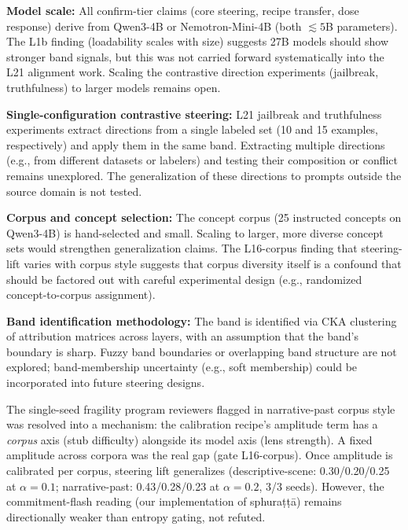 \textbf{Model scale:} All confirm-tier claims (core steering, recipe transfer, dose response) derive from Qwen3-4B
or Nemotron-Mini-4B (both $\lesssim 5$B parameters). The L1b finding (loadability scales with size) suggests
27B models should show stronger band signals, but this was not carried forward systematically into the L21 alignment
work. Scaling the contrastive direction experiments (jailbreak, truthfulness) to larger models remains open.

\textbf{Single-configuration contrastive steering:} L21 jailbreak and truthfulness experiments extract directions from
a single labeled set (10 and 15 examples, respectively) and apply them in the same band. Extracting multiple directions
(e.g., from different datasets or labelers) and testing their composition or conflict remains unexplored.
The generalization of these directions to prompts outside the source domain is not tested.

\textbf{Corpus and concept selection:} The concept corpus (25 instructed concepts on Qwen3-4B) is hand-selected and
small. Scaling to larger, more diverse concept sets would strengthen generalization claims. The L16-corpus finding
that steering-lift varies with corpus style suggests that corpus diversity itself is a confound that should be factored
out with careful experimental design (e.g., randomized concept-to-corpus assignment).

\textbf{Band identification methodology:} The band is identified via CKA clustering of attribution matrices across layers,
with an assumption that the band's boundary is sharp. Fuzzy band boundaries or overlapping band structure are not explored;
band-membership uncertainty (e.g., soft membership) could be incorporated into future steering designs.

The single-seed fragility program reviewers flagged in narrative-past corpus style was resolved into a mechanism:
the calibration recipe's amplitude term has a \emph{corpus} axis (stub difficulty) alongside its model axis (lens strength).
A fixed amplitude across corpora was the real gap (gate L16-corpus).
Once amplitude is calibrated per corpus, steering lift generalizes (descriptive-scene: 0.30/0.20/0.25 at $\alpha=0.1$;
narrative-past: 0.43/0.28/0.23 at $\alpha=0.2$, 3/3 seeds).
However, the commitment-flash reading (our implementation of sphura\d{t}\d{t}\=a) remains directionally weaker than
entropy gating, not refuted.

